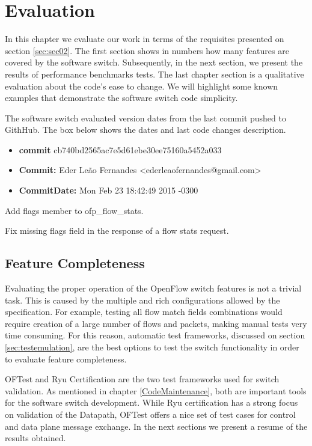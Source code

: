 \chapter{Evaluation}
\label{cap:cap05}

In this chapter we evaluate our work in terms of the requisites presented on section \ref{sec:sec02}. The first section shows in numbers how many features are covered by the software switch. Subsequently, in the next section, we present the results of performance benchmarks tests. The last chapter section is a qualitative evaluation about the code's ease to change. We will highlight some known examples that demonstrate the software switch code simplicity.      

The software switch evaluated version dates from the last commit pushed to GithHub. The box below shows the dates and last code changes description.

\begin{framed}

\begin{itemize}
\item \textbf{commit} cb740bd2565ac7e5d61ebe30ee75160a5452a033
\item   \textbf{Commit:}     Eder Leão Fernandes <ederleaofernandes@gmail.com> 
\item \textbf{CommitDate:} Mon Feb 23 18:42:49 2015 -0300 
\end{itemize}
     
    Add flags member to ofp_flow_stats.
    
    Fix missing flags field in the response of a flow stats request.
\end{framed}

\section{Feature Completeness}
\label{sec:FeatureComplete}
Evaluating the proper operation of the OpenFlow switch features is not a trivial task. This is caused by the multiple and rich configurations allowed by the specification. For example, testing all flow match fields combinations would require creation of a large number of flows and packets, making manual tests very time consuming. For this reason, automatic test frameworks, discussed on section \ref{sec:testemulation}, are the best options to test the switch functionality in order to evaluate feature completeness.    

OFTest and Ryu Certification are the two test frameworks used for switch validation. As mentioned in chapter \ref{CodeMaintenance}, both are important tools for the software switch development. While Ryu certification has a strong focus on validation of the Datapath, OFTest offers a nice set of test cases for control and data plane message exchange. In the next sections we present a resume of the results obtained.  


